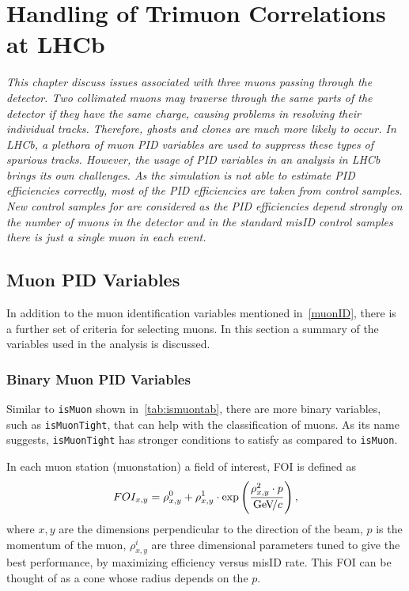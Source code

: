 \chapter{Handling of Trimuon Correlations at LHCb}
\label{chap:trimuon}


\textit{This chapter discuss issues associated with three muons passing through the detector. Two collimated muons may traverse through the same parts of the detector if they have the same charge, causing problems in resolving their individual tracks. Therefore, ghosts and clones are much more likely to occur. In LHCb, a plethora of muon \Gls{PID} variables are used to suppress these types of spurious tracks. However, the usage of \gls{PID} variables in an analysis in \gls{LHCb} brings its own challenges. As the simulation is not able to estimate \gls{PID} efficiencies correctly, most of the \gls{PID} efficiencies are taken from control samples. New control samples for \Bmumumu are considered as the \Gls{PID} efficiencies depend strongly on the number of muons in the detector and in the standard misID control samples there is just a single muon in each event.}

\color{black}

\section{Muon PID Variables}
\label{otherpid}
In addition to the muon identification variables mentioned in~\autoref{muonID}, there is a further set of criteria for selecting muons. In this section a summary of the variables used in the \Bmumumu analysis is discussed.

\subsection{Binary Muon PID Variables }
Similar to \texttt{isMuon} shown in~\autoref{tab:ismuontab}, there are more binary variables, such as \texttt{isMuonTight}, that can help with the classification of muons. As its name suggests, \texttt{isMuonTight} has stronger conditions to satisfy as compared to \texttt{isMuon}. 

In each muon station (\gls{muonstation}) a field of interest, \gls{FOI} is defined as %
\begin{equation}
	FOI_{x,y}=\rho^{0}_{x,y}+\rho^{1}_{x,y}\cdot \exp \left(\frac{\rho^{2}_{x,y}\cdot p}{{\mathrm{\,Ge\kern -0.1em V\!/}c}} \right),
\end{equation}
where $x,y$ are the dimensions perpendicular to the direction of the beam, $p$ is the momentum of the muon, $\rho^{i}_{x,y}$ are three dimensional parameters tuned to give the best performance, by maximizing efficiency versus misID rate. This \gls{FOI} can be thought of as a cone whose radius depends on the $p$.

